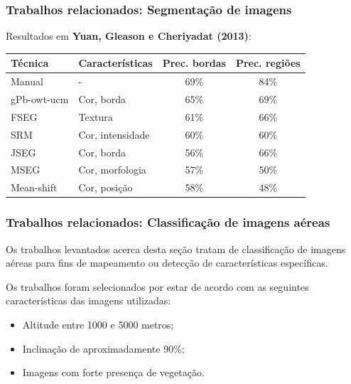 \documentclass[t]{beamer}
\begin{document}
\begin{frame}
	\frametitle{Trabalhos relacionados: Segmentação de imagens}
	
	Resultados em \textbf{Yuan, Gleason e Cheriyadat (2013)}:
	
	\small{
	\begin{table}[h]
	\centering
	\begin{tabulary}{\linewidth}{|L|L|C|C|}
	\hline
	\textbf{Técnica} & \textbf{Características} & \textbf{Prec. bordas} & \textbf{Prec. regiões } \\ \hline
	Manual      & \hspace{1cm} -    & 69\% & 84\% \\ \hline
	gPb-owt-ucm & Cor, borda       & 65\% & 69\% \\ \hline
	FSEG        & Textura          & 61\% & 66\% \\ \hline
	SRM         & Cor, intensidade & 60\% & 60\% \\ \hline
	JSEG        & Cor, borda       & 56\% & 66\% \\ \hline
	MSEG        & Cor, morfologia  & 57\% & 50\% \\ \hline
	Mean-shift  & Cor, posição     & 58\% & 48\% \\ \hline
	\end{tabulary}
	\end{table}
	}
	
\end{frame}

\begin{frame}
	\frametitle{Trabalhos relacionados: Classificação de imagens aéreas}

	Os trabalhos levantados acerca desta seção tratam de classificação de imagens aéreas para fins de mapeamento ou detecção de características específicas. 
	
	\vspace{0.5cm}
	
	Os trabalhos foram selecionados por estar de acordo com as seguintes características das imagens utilizadas:
	
	\begin{itemize}
		\item Altitude entre 1000 e 5000 metros;
		\item Inclinação de aproximadamente 90\%;
		\item Imagens com forte presença de vegetação.
	\end{itemize}
	
\end{frame}
\end{document}

